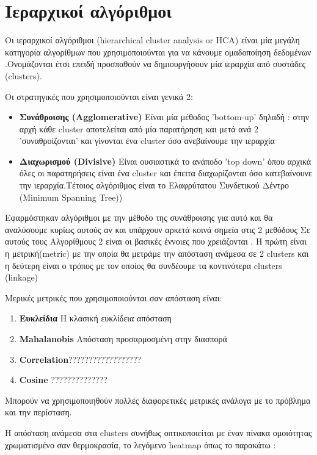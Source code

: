 \section{Ιεραρχικοί αλγόριθμοι}
Οι ιεραρχικοί αλγόριθμοι (hierarchical cluster analysis or HCA) είναι μία μεγάλη κατηγορία αλγορίθμων που χρησιμοποιούνται για να κάνουμε ομαδοποίηση δεδομένων .Ονομάζονται έτσι επειδή προσπαθούν να δημιουργήσουν μία ιεραρχία από συστάδες (clusters).

Οι στρατηγικές που χρησιμοποιούνται είναι γενικά 2:
\begin{itemize}
\item{ \textbf{Συνάθροισης (Agglomerative)} Είναι μία μέθοδος 'bottom-up' δηλαδή : στην αρχή κάθε cluster αποτελείται από μία παρατήρηση και μετά ανά 2 'συναθροίζονται' και γίνονται ένα cluster όσο ανεβαίνουμε την ιεραρχία  }
\item{}\textbf{Διαχωρισμού (Divisive)} Είναι ουσιαστικά το ανάποδο 'top down' όπου αρχικά όλες οι παρατηρήσεις είναι ένα cluster και έπειτα διαχωρίζονται όσο κατεβαίνουνε την ιεραρχία.Τέτοιος αλγόριθμος είναι το Ελαφρύτατου Συνδετικού Δέντρο (Minimum Spanning Tree))
\end{itemize}

Εφαρμόστηκαν αλγόριθμοι με την μέθοδο της συνάθροισης για αυτό και θα αναλύσουμε κυρίως   αυτούς αν και υπάρχουν αρκετά κοινά σημεία στις 2 μεθόδους
Σε αυτούς τους Αλγορίθμους 2 είναι οι βασικές έννοιες που χρειάζονται .
Η πρώτη είναι η μετρική(metric) με την οποία θα μετράμε την απόσταση ανάμεσα σε 2 clusters και η δεύτερη είναι ο τρόπος με τον οποίος θα συνδέουμε τα κοντινότερα clusters (linkage)

Μερικές μετρικές που χρησιμοποιούνται σαν απόσταση είναι:
\begin{enumerate}
   \item \textbf{Ευκλείδια }H κλασική ευκλίδεια απόσταση
\item \textbf{Mahalanobis }Απόσταση προσαρμοσμένη στην διασπορά
\item \textbf{Correlation}??????????????????
\item \textbf{Cosine}  ??????????????
\end{enumerate}
Μπορούν να χρησιμοποιηθούν πολλές διαφορετικές μετρικές ανάλογα με το πρόβλημα και την περίσταση.

\noindent\begin{minipage}{\linewidth}
\centering
{}
H απόσταση ανάμεσα στα   clusters  συνήθως οπτικοποιείται με έναν πίνακα ομοιότητας χρωματισμένο σαν θερμοκρασία, το λεγόμενο heatmap  όπως το παρακάτω :
    \label{fig:heat1}
\end{minipage}

